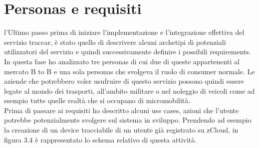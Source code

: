 \documentclass[a4paper,titlepage,12pt]{book}
\begin{document}
{\section{
Personas e requisiti}
l'Ultimo passo prima di iniziare l'implementazione e l'integrazione effettiva del servizio traccar, è stato quello di descrivere alcuni archetipi di potenziali utilizzatori del servizio e quindi successivamente definire i possibili requirements.\\
In questa fase ho analizzato tre personas di cui due di queste appartenenti al mercato B to B e una sola personas che svolgeva il ruolo di consumer normale. Le aziende che potrebbero voler usufruire di questo servizio possono quindi essere legate al mondo dei trasporti, all'ambito militare o nel noleggio di veicoli come ad esempio tutte quelle realtà che si occupano di micromobilità.\\
Prima di passare ai requisiti ho descritto alcuni use cases, azioni che l'utente potrebbe potenzialmente svolgere sul sistema in sviluppo. Prendendo ad esempio la creazione di un device tracciabile di un utente già registrato su zCloud, in figura 3.4 è rappresentato lo schema relativo di questa attività.

}
\end{document}
